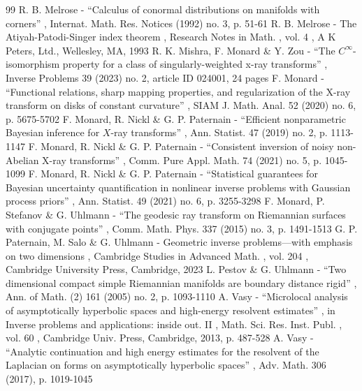 \documentclass[11pt]{article}
\theoremstyle{plain}
\theoremstyle{definition}
\theoremstyle{remark}
\begin{document}
\begin{thebibliography}{99}
 R. B. Melrose - “Calculus of conormal distributions on manifolds with corners” , Internat. Math. Res. Notices (1992) no. 3, p. 51-61
 R. B. Melrose - The Atiyah-Patodi-Singer index theorem , Research Notes in Math. , vol. 4 , A K Peters, Ltd., Wellesley, MA, 1993
 R. K. Mishra, F. Monard \& Y. Zou - “The $C^\infty $-isomorphism property for a class of singularly-weighted x-ray transforms” , Inverse Problems 39 (2023) no. 2, article ID 024001, 24 pages
 F. Monard - “Functional relations, sharp mapping properties, and regularization of the X-ray transform on disks of constant curvature” , SIAM J. Math. Anal. 52 (2020) no. 6, p. 5675-5702
 F. Monard, R. Nickl \& G. P. Paternain - “Efficient nonparametric Bayesian inference for $X$-ray transforms” , Ann. Statist. 47 (2019) no. 2, p. 1113-1147
 F. Monard, R. Nickl \& G. P. Paternain - “Consistent inversion of noisy non-Abelian X-ray transforms” , Comm. Pure Appl. Math. 74 (2021) no. 5, p. 1045-1099
 F. Monard, R. Nickl \& G. P. Paternain - “Statistical guarantees for Bayesian uncertainty quantification in nonlinear inverse problems with Gaussian process priors” , Ann. Statist. 49 (2021) no. 6, p. 3255-3298
 F. Monard, P. Stefanov \& G. Uhlmann - “The geodesic ray transform on Riemannian surfaces with conjugate points” , Comm. Math. Phys. 337 (2015) no. 3, p. 1491-1513
 G. P. Paternain, M. Salo \& G. Uhlmann - Geometric inverse problems—with emphasis on two dimensions , Cambridge Studies in Advanced Math. , vol. 204 , Cambridge University Press, Cambridge, 2023
 L. Pestov \& G. Uhlmann - “Two dimensional compact simple Riemannian manifolds are boundary distance rigid” , Ann. of Math. (2) 161 (2005) no. 2, p. 1093-1110
 A. Vasy - “Microlocal analysis of asymptotically hyperbolic spaces and high-energy resolvent estimates” , in Inverse problems and applications: inside out. II , Math. Sci. Res. Inst. Publ. , vol. 60 , Cambridge Univ. Press, Cambridge, 2013, p. 487-528
 A. Vasy - “Analytic continuation and high energy estimates for the resolvent of the Laplacian on forms on asymptotically hyperbolic spaces” , Adv. Math. 306 (2017), p. 1019-1045
\end{thebibliography}
\end{document}
